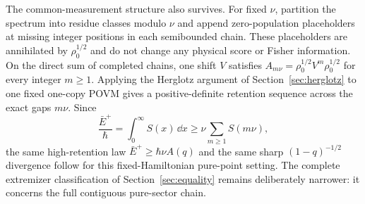 The common-measurement structure also survives.  For fixed $\nu$, partition the spectrum into residue classes modulo $\nu$ and append zero-population placeholders at missing integer positions in each semibounded chain.  These placeholders are annihilated by $\rho_0^{1/2}$ and do not change any physical score or Fisher information.  On the direct sum of completed chains, one shift $V$ satisfies
$A_{m\nu}=\rho_0^{1/2}V^m\rho_0^{1/2}$ for every integer $m\geq1$.  Applying the Herglotz argument of Section~\ref{sec:herglotz} to one fixed one-copy POVM gives a positive-definite retention sequence across the exact gaps $m\nu$.  Since
\begin{equation}
 \frac{\bar E^+}{\hbar}=\int_0^\infty S(x)\,\dd x
 \geq \nu\sum_{m\geq1}S(m\nu),
 \label{eq:anharmonic-block-tail}
\end{equation}
the same high-retention law $\bar E^+\geq\hbar\nu A(q)$ and the same sharp $(1-q)^{-1/2}$ divergence follow for this fixed-Hamiltonian pure-point setting.  The complete extremizer classification of Section~\ref{sec:equality} remains deliberately narrower: it concerns the full contiguous pure-sector chain.

